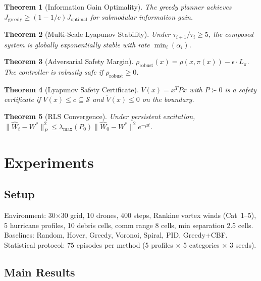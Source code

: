 \documentclass[11pt,twocolumn]{article}
\newtheorem{theorem}{Theorem}[section]
\theoremstyle{definition}
\newcommand{\cS}{\mathcal{S}}
\begin{document}
\begin{theorem}[Information Gain Optimality]
\label{thm:info_opt}
The greedy planner achieves $J_{\text{greedy}} \geq (1-1/e) J_{\text{optimal}}$ for submodular information gain.
\end{theorem}

\begin{theorem}[Multi-Scale Lyapunov Stability]
\label{thm:multiscale}
Under $\tau_{i+1}/\tau_i \geq 5$, the composed system is globally exponentially stable with rate $\min_i(\alpha_i)$.
\end{theorem}

\begin{theorem}[Adversarial Safety Margin]
\label{thm:adv}
$\rho_{\text{robust}}(x) = \rho(x, \pi(x)) - \epsilon \cdot L_\pi$. The controller is robustly safe if $\rho_{\text{robust}} \geq 0$.
\end{theorem}

\begin{theorem}[Lyapunov Safety Certificate]
\label{thm:lyap}
$V(x) = x^T P x$ with $P \succ 0$ is a safety certificate if $V(x) \leq c \subseteq \cS$ and $\dot{V}(x) \leq 0$ on the boundary.
\end{theorem}

\begin{theorem}[RLS Convergence]
Under persistent excitation, $\|\hat{W}_t - W^*\|_P^2 \leq \lambda_{\max}(P_0)\|\hat{W}_0 - W^*\|^2 e^{-\mu t}$.
\end{theorem}

\section{Experiments}
\label{sec:experiments}

\subsection{Setup}
Environment: 30$\times$30 grid, 10 drones, 400 steps, Rankine vortex winds (Cat~1--5), 5 hurricane profiles, 10 debris cells, comm range 8 cells, min separation 2.5 cells. Baselines: Random, Hover, Greedy, Voronoi, Spiral, PID, Greedy+CBF. Statistical protocol: 75 episodes per method (5 profiles $\times$ 5 categories $\times$ 3 seeds).

\subsection{Main Results}
\end{document}
